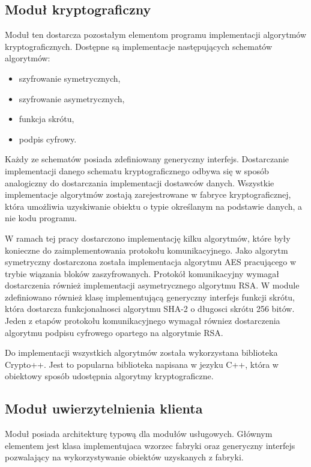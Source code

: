 \subsection[Moduł kryptograficzny][Moduł kryptograficzny]{Moduł kryptograficzny}

Moduł ten dostarcza pozostałym elementom programu implementacji
algorytmów kryptograficznych. Dostępne są implementacje następujących
schematów algorytmów:

\begin{itemize}
\item szyfrowanie symetrycznych,
\item szyfrowanie asymetrycznych,
\item funkcja skrótu,
\item podpis cyfrowy.
\end{itemize}

Każdy ze schematów posiada zdefiniowany generyczny
interfejs. Dostarczanie implementacji danego schematu
kryptograficznego odbywa się w sposób analogiczny do dostarczania
implementacji dostawców danych. Wszystkie implementacje algorytmów
zostają zarejestrowane w fabryce kryptograficznej, która umożliwia
uzyskiwanie obiektu o typie określanym na podstawie danych, a nie kodu
programu.

W ramach tej pracy dostarczono implementację kilku algorytmów, które
były konieczne do zaimplementowania protokołu komunikacyjnego. Jako
algorytm symetryczny dostarczona została implementacja algorytmu AES
pracującego w trybie wiązania bloków zaszyfrowanych. Protokół
komunikacyjny wymagał dostarczenia również implementacji
asymetrycznego algorytmu RSA. W module zdefiniowano również klasę
implementującą generyczny interfejs funkcji skrótu, która dostarcza
funkcjonalnosci algorytmu SHA-2 o długosci skrótu 256 bitów. Jeden z
etapów protokołu komunikacyjnego wymagał równiez dostarczenia
algorytmu podpisu cyfrowego opartego na algorytmie RSA.

Do implementacji wszystkich algorytmów została wykorzystana biblioteka
Crypto++. Jest to popularna biblioteka napisana w jezyku C++, która w
obiektowy sposób udostępnia algorytmy kryptograficzne. 

\subsection[Moduł uwierzytelnienia][Moduł uwierzytelnienia klienta]{Moduł uwierzytelnienia klienta}

Moduł posiada architekturę typową dla modułów usługowych. Głównym
elementem jest klasa implementujaca wzorzec fabryki oraz generyczny
interfejs pozwalający na wykorzystywanie obiektów uzyskanych z
fabryki. 


